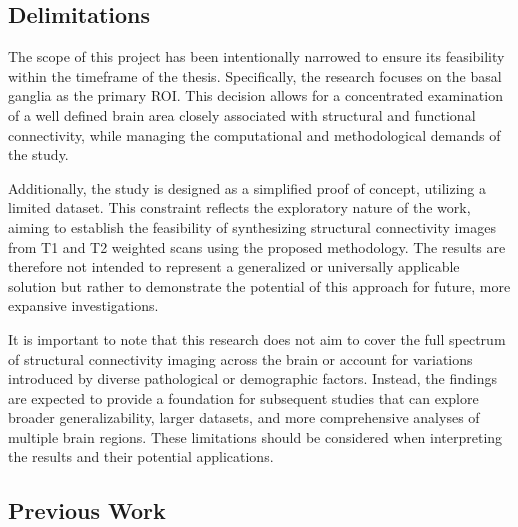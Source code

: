 \subsection{Delimitations}

The scope of this project has been intentionally narrowed to ensure its feasibility within the timeframe of the thesis. Specifically, the research focuses on the basal ganglia as the primary \ac{ROI}. This decision allows for a concentrated examination of a well defined brain area closely associated with structural and functional connectivity, while managing the computational and methodological demands of the study.\par
Additionally, the study is designed as a simplified proof of concept, utilizing a limited dataset. This constraint reflects the exploratory nature of the work, aiming to establish the feasibility of synthesizing structural connectivity images from T1 and T2 weighted scans using the proposed methodology. The results are therefore not intended to represent a generalized or universally applicable solution but rather to demonstrate the potential of this approach for future, more expansive investigations.\par
It is important to note that this research does not aim to cover the full spectrum of structural connectivity imaging across the brain or account for variations introduced by diverse pathological or demographic factors. Instead, the findings are expected to provide a foundation for subsequent studies that can explore broader generalizability, larger datasets, and more comprehensive analyses of multiple brain regions. These limitations should be considered when interpreting the results and their potential applications.

\subsection{Previous Work}

